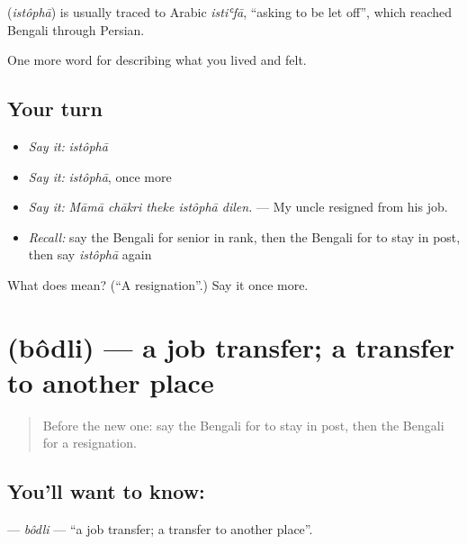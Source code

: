 \begin{cousinweb}
\textbf{} (\emph{istôphā}) is usually traced to Arabic \emph{istiʿfā}, \textquotedblleft{}asking to be let off\textquotedblright{}, which reached Bengali through Persian.
\end{cousinweb}

\begin{grammarlens}[title={What you've built}]
One more word for describing what you lived and felt.
\end{grammarlens}

\subsection*{Your turn}
\begin{itemize}
\raggedright
  \item \emph{Say it:} \emph{istôphā}
  \item \emph{Say it:} \emph{istôphā}, once more
  \item \emph{Say it:} \emph{Māmā chākri theke istôphā dilen.} — My uncle resigned from his job.
  \item \emph{Recall:} say the Bengali for senior in rank, then the Bengali for to stay in post, then say \emph{istôphā} again
\end{itemize}

\begin{tcolorbox}[breakable,colback=teal!4,colframe=teal!35!black,title={Before you move on}]
What does  mean? (\textquotedblleft{}A resignation\textquotedblright{}.) Say it once more.
\end{tcolorbox}
\section[\texorpdfstring{\bn{বদলি} (bôdli)}{বদলি (bôdli)}]{ (bôdli) — a job transfer; a transfer to another place}

\label{lesson:BN-C497-bodli}



\begin{quote}
Before the new one: say the Bengali for to stay in post, then the Bengali for a resignation.
\end{quote}

\subsection*{You'll want to know: }
\textbf{} — \emph{bôdli} — \textquotedblleft{}a job transfer; a transfer to another place\textquotedblright{}.

